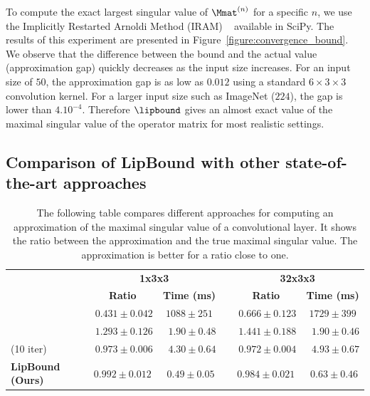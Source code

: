 To compute the exact largest singular value of $\Mmat^{(n)}$ for a specific $n$, we use the Implicitly Restarted Arnoldi Method (IRAM) ~\cite{lehoucq1996deflation} available in SciPy.
The results of this experiment are presented in Figure~\ref{figure:convergence_bound}.
We observe that the difference between the bound and the actual value (approximation gap) quickly decreases as the input size increases.
For an input size of $50$, the approximation gap is as low as $0.012$ using a standard $6\times3\times3$ convolution kernel.
For a larger input size such as ImageNet ($224$), the gap is lower than $4.10^{-4}$.
Therefore $\lipbound$ gives an almost exact value of the maximal singular value of the operator matrix for most realistic settings.

\subsection{Comparison of LipBound with other state-of-the-art approaches} \label{subsection:comparaison_sota}

\begin{table}[ht]
  \centering
  \caption{The following table compares different approaches for computing an approximation of the maximal singular value of a convolutional layer. It shows the ratio between the approximation and the true maximal singular value. The approximation is better for a ratio close to one.}
  {\footnotesize
    \begin{tabular}{lrccrcc}
    \toprule
      &   & \multicolumn{2}{c}{\textbf{1x3x3}} &   & \multicolumn{2}{c}{\textbf{32x3x3}} \\
    \cmidrule{3-4}\cmidrule{6-7}  &   & \textbf{Ratio} & \textbf{Time (ms)} &   & \textbf{Ratio} & \textbf{Time (ms)} \\
    \midrule
    \citeauthor{sedghi2018singular} &   & $\phantom{.}0.431\pm0.042$ & $1088\pm251$ &   & $\phantom{.}0.666\pm0.123$ & $1729\pm399$ \\
    \citeauthor{singla2019bounding} &   & $\phantom{.}1.293\pm0.126$ & $\phantom{..}1.90\pm0.48$ &   & $\phantom{.}1.441\pm0.188$ & $\phantom{..}1.90\pm0.46$ \\
    \citeauthor{farnia2018generalizable} (10 iter) &   & $\phantom{.}0.973\pm0.006$ & $\phantom{..}4.30\pm0.64$ &   & $\phantom{.}0.972\pm0.004$ & $\phantom{..}4.93\pm0.67$ \\
    \midrule
    \midrule
    \textbf{LipBound (Ours)} &   & $\mathbf{0.992}\pm0.012$ & $\phantom{.}\mathbf{0.49}\pm0.05$ &   & $\mathbf{0.984}\pm0.021$ & $\phantom{.}\mathbf{0.63}\pm0.46$ \\
    \bottomrule
    \end{tabular}%
  }
  \label{table:comparaison}%
\end{table}


